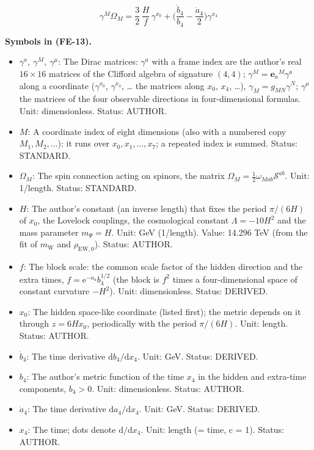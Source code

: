 \documentclass[
  10pt,
]{article}
\providecommand{\tightlist}{%
  \setlength{\itemsep}{0pt}\setlength{\parskip}{0pt}}
\begin{document}
\[
\gamma^M\Omega_M = \frac32\,\frac{H}{f}\,\gamma^{x_0} + \Big(\frac{\dot b_4}{b_4} - \frac{\dot
 a_4}{2}\Big)\gamma^{x_4} \tag{FE-13}
\]

\textbf{Symbols in (FE-13).}

\begin{itemize}
\tightlist
\item
  \(\gamma^a,\ \gamma^M,\ \gamma^\mu\): The Dirac matrices: \(\gamma^a\)
  with a frame index are the author's real \(16 \times 16\) matrices of
  the Clifford algebra of signature \((4, 4)\);
  \(\gamma^M = \mathbf{e}_a{}^M\gamma^a\) along a coordinate
  (\(\gamma^{x_0}\), \(\gamma^{x_4}\), \ldots{} the matrices along
  \(x_0\), \(x_4\), \ldots), \(\gamma_M = g_{MN}\gamma^N\);
  \(\gamma^\mu\) the matrices of the four observable directions in
  four-dimensional formulas. Unit: dimensionless. Status: AUTHOR.
\item
  \(M\): A coordinate index of eight dimensions (also with a numbered
  copy \(M_1, M_2, \dots\)): it runs over \(x_0, x_1, \dots, x_7\); a
  repeated index is summed. Status: STANDARD.
\item
  \(\Omega_M\): The spin connection acting on spinors, the matrix
  \(\Omega_M = \frac12\omega_{Mab}\mathcal{S}^{ab}\). Unit: 1/length.
  Status: STANDARD.
\item
  \(H\): The author's constant (an inverse length) that fixes the period
  \(\pi/(6H)\) of \(x_0\), the Lovelock couplings, the cosmological
  constant \(\Lambda = -10H^2\) and the mass parameter \(m_\Psi = H\).
  Unit: GeV (1/length). Value: 14.296 TeV (from the fit of
  \(m_{\mathrm{W}}\) and \(\rho_{\mathrm{EW},0}\)). Status: AUTHOR.
\item
  \(f\): The block scale: the common scale factor of the hidden
  direction and the extra times, \(f = \mathrm{e}^{-a_4}b_4^{1/2}\) (the
  block is \(f^2\) times a four-dimensional space of constant curvature
  \(-H^2\)). Unit: dimensionless. Status: DERIVED.
\item
  \(x_0\): The hidden space-like coordinate (listed first); the metric
  depends on it through \(z = 6Hx_0\), periodically with the period
  \(\pi/(6H)\). Unit: length. Status: AUTHOR.
\item
  \(\dot b_4\): The time derivative \(\mathrm{d}b_4/\mathrm{d}x_4\).
  Unit: GeV. Status: DERIVED.
\item
  \(b_4\): The author's metric function of the time \(x_4\) in the
  hidden and extra-time components, \(b_4 > 0\). Unit: dimensionless.
  Status: AUTHOR.
\item
  \(\dot a_4\): The time derivative \(\mathrm{d}a_4/\mathrm{d}x_4\).
  Unit: GeV. Status: DERIVED.
\item
  \(x_4\): The time; dots denote \(\mathrm{d}/\mathrm{d}x_4\). Unit:
  length (= time, c = 1). Status: AUTHOR.
\end{itemize}
\end{document}
